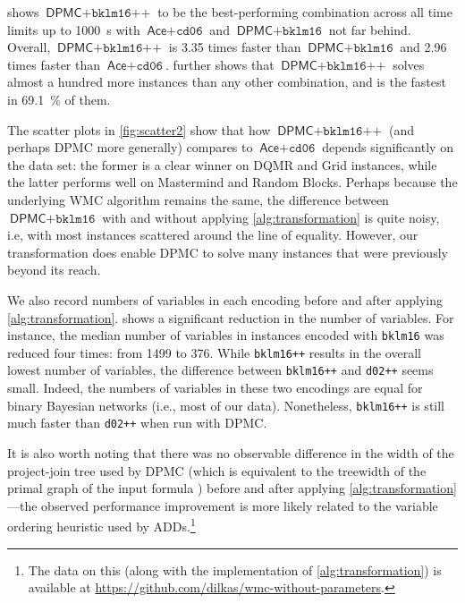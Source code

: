  shows $\textsf{DPMC}+\texttt{bklm16++}$ to be the
best-performing combination across all time limits up to \SI{1000}{\second} with
$\textsf{Ace} + \texttt{cd06}$ and $\textsf{DPMC}+\texttt{bklm16}$ not far
behind. Overall, $\textsf{DPMC}+\texttt{bklm16++}$ is 3.35 times faster than
$\textsf{DPMC}+\texttt{bklm16}$ and 2.96 times faster than
$\textsf{Ace}+\texttt{cd06}$.  further shows that
$\textsf{DPMC}+\texttt{bklm16++}$ solves almost a hundred more instances than
any other combination, and is the fastest in \SI{69.1}{\percent} of them.

The scatter plots in \cref{fig:scatter2} show that how $\textsf{DPMC} +
\texttt{bklm16++}$ (and perhaps \textsf{DPMC} more generally) compares to
$\textsf{Ace} + \texttt{cd06}$ depends significantly on the data set: the former
is a clear winner on DQMR and Grid instances, while the latter performs well on
Mastermind and Random Blocks. Perhaps because the underlying WMC algorithm
remains the same, the difference between $\textsf{DPMC} + \texttt{bklm16}$ with
and without applying \cref{alg:transformation} is quite noisy, i.e, with most
instances scattered around the line of equality. However, our transformation
does enable \textsf{DPMC} to solve many instances that were previously beyond
its reach.

We also record numbers of variables in each encoding before and after applying
\cref{alg:transformation}.  shows a significant reduction in the
number of variables. For instance, the median number of variables in instances
encoded with \texttt{bklm16} was reduced four times: from 1499 to 376. While
\texttt{bklm16++} results in the overall lowest number of variables, the
difference between \texttt{bklm16++} and \texttt{d02++} seems small. Indeed, the
numbers of variables in these two encodings are equal for binary Bayesian
networks (i.e., most of our data). Nonetheless, \texttt{bklm16++} is still much
faster than \texttt{d02++} when run with \textsf{DPMC}.

It is also worth noting that there was no observable difference in the width of
the project-join tree used by DPMC (which is equivalent to the treewidth of the
primal graph of the input formula \citep{DBLP:conf/cp/DudekPV20}) before
and after applying \cref{alg:transformation}---the observed performance
improvement is more likely related to the variable ordering heuristic used by
ADDs.\footnote{The data on this (along with the implementation of
  \cref{alg:transformation}) is available at
  \url{https://github.com/dilkas/wmc-without-parameters}.}

